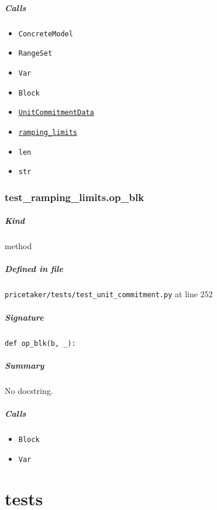 \documentclass[11pt]{report}
\begin{document}
\paragraph{Calls}
\begin{itemize}[leftmargin=*]
  \item \texttt{ConcreteModel}
  \item \texttt{RangeSet}
  \item \texttt{Var}
  \item \texttt{Block}
  \item \hyperref[def:pricetaker-unit_commitment.py:UnitCommitmentData:L26]{\texttt{UnitCommitmentData}}
  \item \hyperref[def:pricetaker-unit_commitment.py:ramping_limits:L205]{\texttt{ramping\_limits}}
  \item \texttt{len}
  \item \texttt{str}
\end{itemize}
\subsection{test\_ramping\_limits.op\_blk}
\label{def:pricetaker-tests-test_unit_commitment.py:test_ramping_limits.op_blk:L252}
\paragraph{Kind} method
\paragraph{Defined in file} \texttt{pricetaker/tests/test\_unit\_commitment.py} at line 252
\paragraph{Signature} \texttt{def op\_blk(b, \_):}
\paragraph{Summary} No docstring.
\paragraph{Calls}
\begin{itemize}[leftmargin=*]
  \item \texttt{Block}
  \item \texttt{Var}
\end{itemize}

\chapter{tests}
\end{document}
